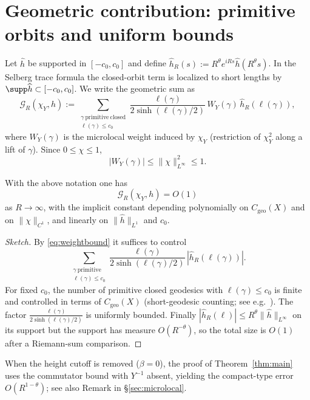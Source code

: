 \section{Geometric contribution: primitive orbits and uniform bounds}\label{sec:geometric}
Let $\widehat{h}$ be supported in $[-c_0,c_0]$ and define $\widehat{h}_R(s):=R^\theta e^{iRs}\widehat{h}(R^\theta s)$. In the Selberg trace formula the closed-orbit term is localized to short lengths by $\supp \widehat{h}\subset[-c_0,c_0]$. We write the geometric sum as
\[
\mathcal{G}_R(\chi_Y,h)
:= \sum_{\substack{\gamma\ \mathrm{primitive\ closed}\\ \ell(\gamma)\le c_0}}
\frac{\ell(\gamma)}{2\sinh(\ell(\gamma)/2)}\,
W_Y(\gamma)\,\widehat{h}_R(\ell(\gamma)),
\]
where $W_Y(\gamma)$ is the microlocal weight induced by $\chi_Y$ (restriction of $\chi_Y^2$ along a lift of $\gamma$). Since $0\le \chi\le 1$,
\begin{equation}\label{eq:weightbound}
|W_Y(\gamma)|\le \|\chi\|_{L^\infty}^2\le 1 .
\end{equation}

\begin{proposition}\label{prop:geom}
With the above notation one has
\[
\mathcal{G}_R(\chi_Y,h)=O(1)
\]
as $R\to\infty$, with the implicit constant depending polynomially on $C_{\mathrm{geo}}(X)$ and on $\|\chi\|_{C^1}$, and linearly on $\|\widehat{h}\|_{L^1}$ and $c_0$.
\end{proposition}

\begin{proof}[Sketch]
By \eqref{eq:weightbound} it suffices to control
\[
\sum_{\substack{\gamma\ \mathrm{primitive}\\ \ell(\gamma)\le c_0}}
\frac{\ell(\gamma)}{2\sinh(\ell(\gamma)/2)}\,|\widehat{h}_R(\ell(\gamma))|.
\]
For fixed $c_0$, the number of primitive closed geodesics with $\ell(\gamma)\le c_0$ is finite and controlled in terms of $C_{\mathrm{geo}}(X)$ (short-geodesic counting; see e.g.\ \cite{buser1992}). The factor $\frac{\ell(\gamma)}{2\sinh(\ell(\gamma)/2)}$ is uniformly bounded. Finally $|\widehat{h}_R(\ell)|\le R^\theta \|\widehat{h}\|_{L^\infty}$ on its support but the support has measure $O(R^{-\theta})$, so the total size is $O(1)$ after a Riemann-sum comparison.
\end{proof}

\begin{remark}[Boundary case $\beta=0$]
When the height cutoff is removed ($\beta=0$), the proof of Theorem~\ref{thm:main} uses the commutator bound with $Y^{-1}$ absent, yielding the compact-type error $O(R^{1-\theta})$; see also Remark in \S\ref{sec:microlocal}.
\end{remark}
